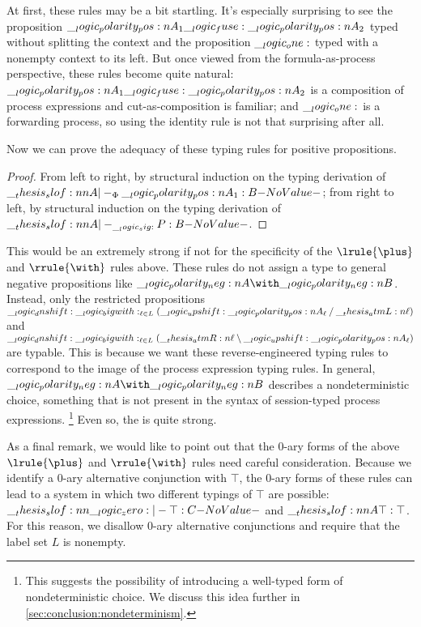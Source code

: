 At first, these rules may be a bit startling.
It's especially surprising to see the proposition $\__logic_polarity_pos:n {A}_1 \__logic_fuse: \__logic_polarity_pos:n {A}_2$ typed without splitting the context and the proposition $\__logic_one:$ typed with a nonempty context to its left.
But once viewed from the formula-as-process perspective, these rules become quite natural: $\__logic_polarity_pos:n {A}_1 \__logic_fuse: \__logic_polarity_pos:n {A}_2$ is a composition of process expressions and cut-as-composition is familiar; and $\__logic_one:$ is a forwarding process, so using the identity rule is not that surprising after all.

Now we can prove the adequacy of these typing rules for positive propositions.
%
\thmembedtypeprops*
\begin{proof}
  From left to right, by structural induction on the typing derivation of $\slof{A |-_{\orsig} \p{A}_1 : B}$;
  from right to left, by structural induction on the typing derivation of $\slof{A |-_{\sig} P : B}$.
\end{proof}
%
This would be an extremely strong  if not for the specificity of the $\lrule{\plus}$ and $\rrule{\with}$ rules above.
These rules do not assign a type to general negative propositions like $\n{A} \with \n{B}$.
Instead, only the restricted propositions $\__logic_dnshift: {\textstyle \__logic_bigwith:_{\ell \in L}(\__logic_upshift: \__logic_polarity_pos:n {A}_{\ell} \mathbin { / } \__thesis_atmL:n {\ell})}$ and $\__logic_dnshift: {\textstyle \__logic_bigwith:_{\ell \in L}(\__thesis_atmR:n {\ell} \mathbin { \setminus } \__logic_upshift: \__logic_polarity_pos:n {A}_{\ell})}$ are typable.
This is because we want these reverse-engineered typing rules to correspond to the image of the process expression typing rules.
In general, $\n{A} \with \n{B}$ describes a nondeterministic choice, something that is not present in the syntax of session-typed process expressions.%
\footnote{This suggests the possibility of introducing a well-typed form of nondeterministic choice.
  We discuss this idea further in \cref{sec:conclusion:nondeterminism}.}
Even so, the  is quite strong.

As a final remark, we would like to point out that the $0$-ary forms of the above $\lrule{\plus}$ and $\rrule{\with}$ rules need careful consideration.
Because we identify a $0$-ary alternative conjunction with $\top$, the $0$-ary forms of these rules can lead to a system in which two different typings of $\top$ are possible: $\slof{\zero |- \top : C}$ and $\slof{A |- \top : \top}$.
For this reason, we disallow $0$-ary alternative conjunctions and require that the label set $L$ is nonempty.

